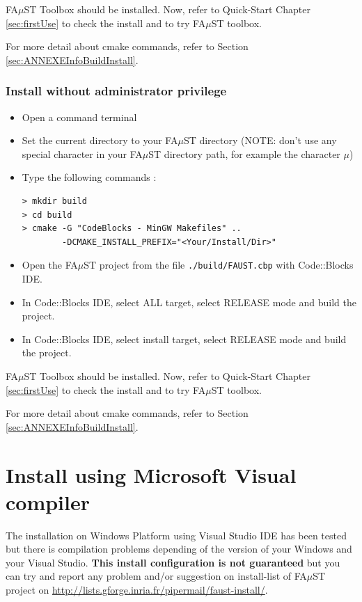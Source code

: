 FA$\mu$ST Toolbox should be installed. Now, refer to Quick-Start Chapter \ref{sec:firstUse} to check the install and to try FA$\mu$ST toolbox.

For more detail about cmake commands, refer to Section \ref{sec:ANNEXEInfoBuildInstall}.

\subsubsection{Install without administrator privilege}
\label{sec:WinMinGWCodeBlocksNoAdminBasicInstall}
\begin{itemize}
\item Open a command terminal
\item Set the current directory to your FA$\mu$ST directory (NOTE: don't use any special character in your FA$\mu$ST directory path, for example the character $\mu$)
\item Type the following commands : 

\lstset{style=customBash}
\begin{lstlisting}
> mkdir build
> cd build
> cmake -G "CodeBlocks - MinGW Makefiles" .. 
	    -DCMAKE_INSTALL_PREFIX="<Your/Install/Dir>"
\end{lstlisting}

\item Open the FA$\mu$ST project from the file \texttt{./build/FAUST.cbp} with Code::Blocks IDE.
\item In Code::Blocks IDE, select ALL target, select RELEASE mode and build the project.
\item In Code::Blocks IDE, select install target, select RELEASE mode and build the project.
\end{itemize}

FA$\mu$ST Toolbox should be installed. Now, refer to Quick-Start Chapter \ref{sec:firstUse} to check the install and to try FA$\mu$ST toolbox.

For more detail about cmake commands, refer to Section \ref{sec:ANNEXEInfoBuildInstall}.


\section{Install using Microsoft Visual compiler}\label{sec:WinInstallVS}

The installation on Windows Platform using Visual Studio IDE has been tested but there is compilation problems depending of the version of your Windows and your Visual Studio. \textbf{This install configuration is not guaranteed} but you can try and report any problem and/or suggestion on install-list of FA$\mu$ST project on \url{http://lists.gforge.inria.fr/pipermail/faust-install/}. 

